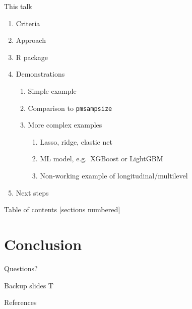 \documentclass[11pt]{beamer}
\begin{document}
\begin{frame}{This talk}
    \begin{enumerate}
        \item Criteria
        \item Approach
        \item R package
        \item Demonstrations
        \begin{enumerate}
            \item Simple example
            \item Comparison to \texttt{pmsampsize}
            \item More complex examples
            \begin{enumerate}
                \item Lasso, ridge, elastic net
                \item ML model, e.g.\ XGBoost or LightGBM
                \item Non-working example of longitudinal/multilevel
            \end{enumerate}
        \end{enumerate}
        \item Next steps
    \end{enumerate}
\end{frame}




\begin{frame}{Table of contents}
  [sections numbered]
  \tableofcontents%
\end{frame}



\section{Conclusion}

{
\begin{frame}
  Questions?
\end{frame}
}

\appendix

\begin{frame}[fragile]{Backup slides}
T
\end{frame}

\begin{frame}[allowframebreaks]{References}
  
  
\end{frame}
\end{document}
